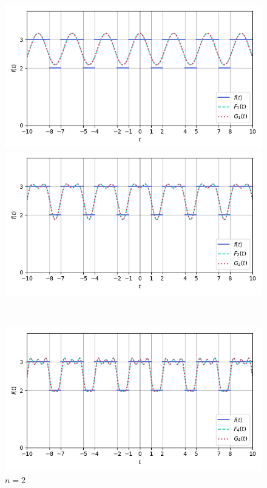 \documentclass[a4paper]{article}
\begin{document}
\begin{figure}[H]
    \begin{minipage}{0.5\textwidth}
        \centering \includegraphics[width=\textwidth]{square_wave/1.png}
        \caption{$n = 1$}
    \end{minipage}\hfill
    \begin{minipage}{0.5\textwidth}
        \centering \includegraphics[width=\textwidth]{square_wave/2.png}
        \caption{$n = 2$}
    \end{minipage}\\[1em]
    \begin{minipage}{0.5\textwidth}
        \centering \includegraphics[width=\textwidth]{square_wave/4.png}

\end{minipage}
\end{figure}
\end{document}
